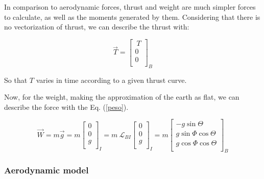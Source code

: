 \documentclass[10pt,fleqn,a4paper,twoside]{article}
\begin{document}

In comparison to aerodynamic forces, thrust and weight are much simpler forces to calculate, as well as the moments generated by them. Considering that there is no vectorization of thrust, we can describe the thrust with:


\begin{equation}
\vec{T}= 
\begin{bmatrix}
\ T \\
0\\
0 \\
\end{bmatrix}
_{B}
\label{empuxo}
\end{equation}


So that $ T $ varies in time according to a given thrust curve. 

Now, for the weight, making the approximation of the earth as flat, we can describe the force with the Eq. (\ref{peso}).

\begin{equation}
\vec{W}=m\vec{g}=m
\begin{bmatrix}
0\\0\\g\\
\end{bmatrix}_{I}=m\ \mathcal{L}_{BI}
\begin{bmatrix}
0\\0\\g\\
\end{bmatrix}_{I}=m
\begin{bmatrix}
-g\sin\Theta \\
g\sin\Phi\cos\Theta \\
g\cos\Phi\cos\Theta \\
\end{bmatrix}_{B}
\label{peso}
\end{equation}

\subsubsection{Aerodynamic model}
\end{document}
